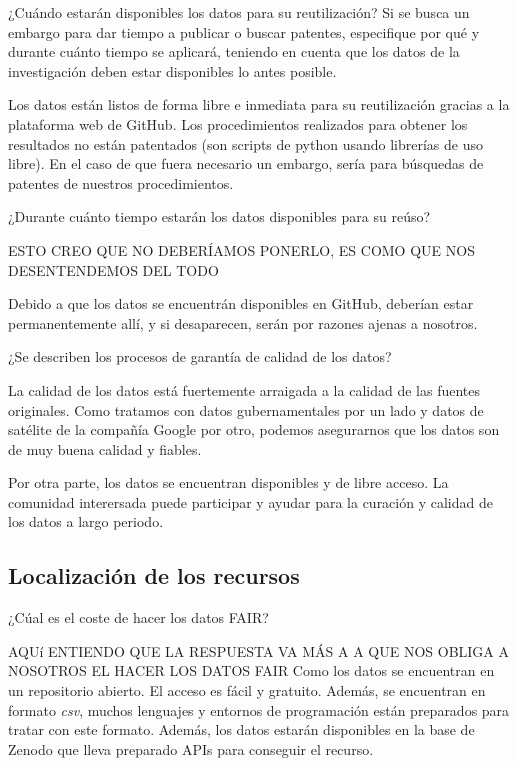 \documentclass[12pt, spanish]{article}
\begin{document}
\begin{shaded}
¿Cuándo estarán disponibles los datos para su reutilización? Si se busca un embargo para dar tiempo a publicar o buscar patentes, especifique por qué y durante cuánto tiempo se aplicará, teniendo en cuenta que los datos de la investigación deben estar disponibles lo antes posible.
\end{shaded}
Los datos están listos de forma libre e inmediata para su reutilización gracias a la plataforma web de GitHub. Los procedimientos realizados para obtener los resultados no están patentados (son scripts de python usando librerías de uso libre). En el caso de que fuera necesario un embargo, sería para búsquedas de patentes de nuestros procedimientos.
\\
\begin{shaded}
¿Durante cuánto tiempo estarán los datos disponibles para su reúso?
\end{shaded}
ESTO CREO QUE NO DEBERÍAMOS PONERLO, ES COMO QUE NOS DESENTENDEMOS DEL TODO

Debido a que los datos se encuentrán disponibles en GitHub, deberían estar permanentemente allí, y si desaparecen, serán por razones ajenas a nosotros.


\begin{shaded}
¿Se describen los procesos de garantía de calidad de los datos?
\end{shaded}
La calidad de los datos está fuertemente arraigada a la calidad de las fuentes originales. Como tratamos con datos gubernamentales por un lado y datos de satélite de la compañía Google por otro, podemos asegurarnos que los datos son de muy buena calidad y fiables.

Por otra parte, los datos se encuentran disponibles y de libre acceso. La comunidad interersada puede participar y ayudar para la curación y calidad de los datos a largo periodo.



\subsection{Localización de los recursos}

\begin{shaded}
¿Cúal es el coste de hacer los datos FAIR?

\end{shaded}

AQUí ENTIENDO QUE LA RESPUESTA VA MÁS A A QUE NOS OBLIGA A NOSOTROS EL HACER LOS DATOS FAIR
Como los datos se encuentran en un repositorio abierto. El acceso es fácil y gratuito. Además, se encuentran en formato \textit{csv}, muchos lenguajes y entornos de programación están preparados para tratar con este formato. Además, los datos estarán disponibles en la base de Zenodo que lleva preparado APIs para conseguir el recurso.
\end{document}
